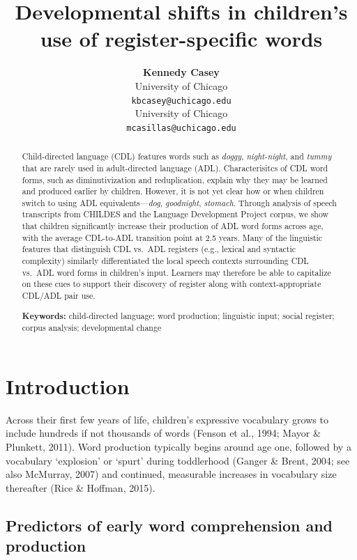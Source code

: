 \documentclass[10pt, letterpaper]{article}
\title{Developmental shifts in children's use of register-specific
words}
\author{{\large \bf Kennedy Casey} \\ University of Chicago \\ \texttt{kbcasey@uchicago.edu} \And {\large \bf Marisa Casillas} \\ University of Chicago \\ \texttt{mcasillas@uchicago.edu}}
\begin{document}
\maketitle

\begin{abstract}
Child-directed language (CDL) features words such as \emph{doggy},
\emph{night-night}, and \emph{tummy} that are rarely used in
adult-directed language (ADL). Characterisitcs of CDL word forms, such
as diminutivization and reduplication, explain why they may be learned
and produced earlier by children. However, it is not yet clear how or
when children switch to using ADL equivalents---\emph{dog},
\emph{goodnight}, \emph{stomach}. Through analysis of speech transcripts
from CHILDES and the Language Development Project corpus, we show that
children significantly increase their production of ADL word forms
across age, with the average CDL-to-ADL transition point at 2.5 years.
Many of the linguistic features that distinguish CDL vs.~ADL registers
(e.g., lexical and syntactic complexity) similarly differentiated the
local speech contexts surrounding CDL vs.~ADL word forms in children's
input. Learners may therefore be able to capitalize on these cues to
support their discovery of register along with context-appropriate
CDL/ADL pair use.

\textbf{Keywords:}
child-directed language; word production; linguistic input; social
register; corpus analysis; developmental change
\end{abstract}

\hypertarget{introduction}{%
\section{Introduction}\label{introduction}}

Across their first few years of life, children's expressive vocabulary
grows to include hundreds if not thousands of words (Fenson et al.,
1994; Mayor \& Plunkett, 2011). Word production typically begins around
age one, followed by a vocabulary `explosion' or `spurt' during
toddlerhood (Ganger \& Brent, 2004; see also McMurray, 2007) and
continued, measurable increases in vocabulary size thereafter (Rice \&
Hoffman, 2015).

\hypertarget{predictors-of-early-word-comprehension-and-production}{%
\subsection{Predictors of early word comprehension and
production}\label{predictors-of-early-word-comprehension-and-production}}
\end{document}
